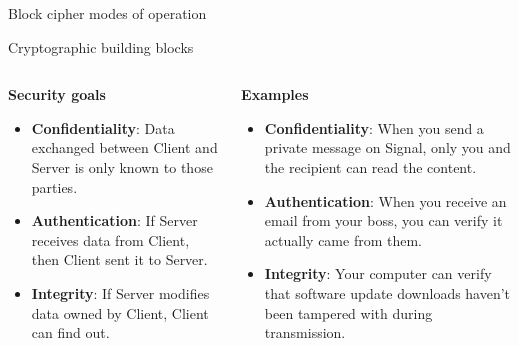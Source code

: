 \documentclass[aspectratio=169, lualatex, handout]{beamer}
\begin{document}
\begin{frame}{Block cipher modes of operation}
\end{frame}

\begin{frame}{Cryptographic building blocks}
	\begin{columns}[c]
		\begin{column}{0.5\textwidth}
			\textbf{Security goals}
			\begin{itemize}
				\item \textbf{Confidentiality}: Data exchanged between Client and Server
				      is only known to those parties.

				\item \textbf{Authentication}: If Server receives data from Client,
				      then Client sent it to Server.

				\item \textbf{Integrity}: If Server modifies data owned by Client,
				      Client can find out.
			\end{itemize}
		\end{column}

		\begin{column}{0.5\textwidth}
			\textbf{Examples}
			\begin{itemize}[<+->]
				\item \textbf{Confidentiality}: When you send a private message on Signal,
				      only you and the recipient can read the content.
				\item \textbf{Authentication}: When you receive an email from your boss,
				      you can verify it actually came from them.
				\item \textbf{Integrity}: Your computer can verify that software update
				      downloads haven't been tampered with during transmission.
			\end{itemize}
		\end{column}
	\end{columns}
\end{frame}
\end{document}
